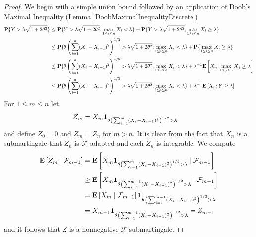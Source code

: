 \begin{proof}
We begin with a simple union bound followed by an application of Doob's Maximal Inequality (Lemma \ref{DoobMaximalInequalityDiscrete})
\begin{align*}
\probability{Y > \lambda \sqrt{1+2\theta^2}} 
&\leq \probability{Y > \lambda \sqrt{1+2\theta^2}; \max_{1 \leq i \leq  n} X_i < \lambda} + 
\probability{Y > \lambda \sqrt{1+2\theta^2} ; \max_{1 \leq i \leq  n} X_i \geq \lambda} \\
&\leq \probability{\theta \left( \sum_{i=1}^n (X_i-X_{i-1})^2 \right)^{1/2} > \lambda \sqrt{1+2\theta^2}; \max_{1 \leq i \leq  n} X_i < \lambda} + 
\probability{\max_{1 \leq i \leq  n} X_i \geq \lambda} \\
&\leq \probability{\theta \left( \sum_{i=1}^n (X_i-X_{i-1})^2 \right)^{1/2} > \lambda \sqrt{1+2\theta^2}; \max_{1 \leq i \leq  n} X_i < \lambda} + 
\lambda^{-1} \expectation{X_n; \max_{1 \leq j \leq n} X_j \geq \lambda} \\
&\leq \probability{\theta \left( \sum_{i=1}^n (X_i-X_{i-1})^2 \right)^{1/2} > \lambda \sqrt{1+2\theta^2}; \max_{1 \leq i \leq  n} X_i < \lambda} + 
\lambda^{-1} \expectation{X_n; Y \geq \lambda} \\
\end{align*}
For $1 \leq m \leq n$ let
\begin{align*}
Z_m &= X_m \characteristic{\theta \left( \sum_{i=1}^m (X_i-X_{i-1})^2 \right)^{1/2} > \lambda}
\end{align*}
and define $Z_0 = 0$ and $Z_m = Z_n$ for $m > n$.  It is clear from the fact that $X_n$ is a submartingale that $Z_n$ is $\mathcal{F}$-adapted and each $Z_n$ is integrable.  We compute
\begin{align*}
\cexpectationlong{\mathcal{F}_{m-1}}{Z_m} 
&=\cexpectationlong{\mathcal{F}_{m-1}}{ X_m \characteristic{\theta \left( \sum_{i=1}^m (X_i-X_{i-1})^2 \right)^{1/2} > \lambda}} \\
&\geq \cexpectationlong{\mathcal{F}_{m-1}}{ X_m \characteristic{\theta \left( \sum_{i=1}^{m-1} (X_i-X_{i-1})^2 \right)^{1/2} > \lambda}} \\
&= \cexpectationlong{\mathcal{F}_{m-1}}{ X_m } \characteristic{\theta \left( \sum_{i=1}^{m-1} (X_i-X_{i-1})^2 \right)^{1/2} > \lambda}\\
&= X_{m-1}\characteristic{\theta \left( \sum_{i=1}^{m-1} (X_i-X_{i-1})^2 \right)^{1/2} > \lambda} = Z_{m-1}\\
\end{align*}
and it follows that $Z$ is a nonnegative $\mathcal{F}$-submartingale.


\end{proof}
